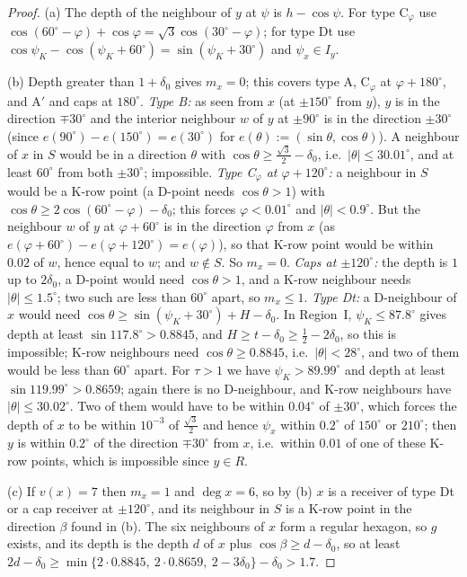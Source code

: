 \documentclass[11pt]{amsart}
\theoremstyle{definition}
\theoremstyle{remark}
\begin{document}
\begin{proof}
(a) The depth of the neighbour of $y$ at $\psi$ is $h-\cos\psi$. For type C$_\varphi$ use $\cos(60^\circ-\varphi)+\cos\varphi=\sqrt3\cos(30^\circ-\varphi)$; for type Dt use $\cos\psi_K-\cos(\psi_K+60^\circ)=\sin(\psi_K+30^\circ)$ and $\psi_x\in I_y$.

(b) Depth greater than $1+\delta_0$ gives $m_x=0$; this covers type A, C$_\varphi$ at $\varphi+180^\circ$, and A$'$ and caps at $180^\circ$. \emph{Type B:} as seen from $x$ (at $\pm150^\circ$ from $y$), $y$ is in the direction $\mp30^\circ$ and the interior neighbour $w$ of $y$ at $\pm90^\circ$ is in the direction $\pm30^\circ$ (since $e(90^\circ)-e(150^\circ)=e(30^\circ)$ for $e(\theta):=(\sin\theta,\cos\theta)$). A neighbour of $x$ in $S$ would be in a direction $\theta$ with $\cos\theta\ge\frac{\sqrt3}2-\delta_0$, i.e.\ $|\theta|\le30.01^\circ$, and at least $60^\circ$ from both $\pm30^\circ$; impossible. \emph{Type C$_\varphi$ at $\varphi+120^\circ$:} a neighbour in $S$ would be a K-row point (a D-point needs $\cos\theta>1$) with $\cos\theta\ge2\cos(60^\circ-\varphi)-\delta_0$; this forces $\varphi<0.01^\circ$ and $|\theta|<0.9^\circ$. But the neighbour $w$ of $y$ at $\varphi+60^\circ$ is in the direction $\varphi$ from $x$ (as $e(\varphi+60^\circ)-e(\varphi+120^\circ)=e(\varphi)$), so that K-row point would be within $0.02$ of $w$, hence equal to $w$; and $w\notin S$. So $m_x=0$. \emph{Caps at $\pm120^\circ$:} the depth is $1$ up to $2\delta_0$, a D-point would need $\cos\theta>1$, and a K-row neighbour needs $|\theta|\le1.5^\circ$; two such are less than $60^\circ$ apart, so $m_x\le1$. \emph{Type Dt:} a D-neighbour of $x$ would need $\cos\theta\ge\sin(\psi_K+30^\circ)+H-\delta_0$. In Region~I, $\psi_K\le87.8^\circ$ gives depth at least $\sin117.8^\circ>0.8845$, and $H\ge t-\delta_0\ge\frac12-2\delta_0$, so this is impossible; K-row neighbours need $\cos\theta\ge0.8845$, i.e.\ $|\theta|<28^\circ$, and two of them would be less than $60^\circ$ apart. For $\tau>1$ we have $\psi_K>89.99^\circ$ and depth at least $\sin119.99^\circ>0.8659$; again there is no D-neighbour, and K-row neighbours have $|\theta|\le30.02^\circ$. Two of them would have to be within $0.04^\circ$ of $\pm30^\circ$, which forces the depth of $x$ to be within $10^{-3}$ of $\frac{\sqrt3}2$ and hence $\psi_x$ within $0.2^\circ$ of $150^\circ$ or $210^\circ$; then $y$ is within $0.2^\circ$ of the direction $\mp30^\circ$ from $x$, i.e.\ within $0.01$ of one of these K-row points, which is impossible since $y\in R$.

(c) If $v(x)=7$ then $m_x=1$ and $\deg x=6$, so by (b) $x$ is a receiver of type Dt or a cap receiver at $\pm120^\circ$, and its neighbour in $S$ is a K-row point in the direction $\beta$ found in (b). The six neighbours of $x$ form a regular hexagon, so $g$ exists, and its depth is the depth $d$ of $x$ plus $\cos\beta\ge d-\delta_0$, so at least $2d-\delta_0\ge\min\{2\cdot0.8845,\ 2\cdot0.8659,\ 2-3\delta_0\}-\delta_0>1.7$.
\end{proof}
\end{document}
